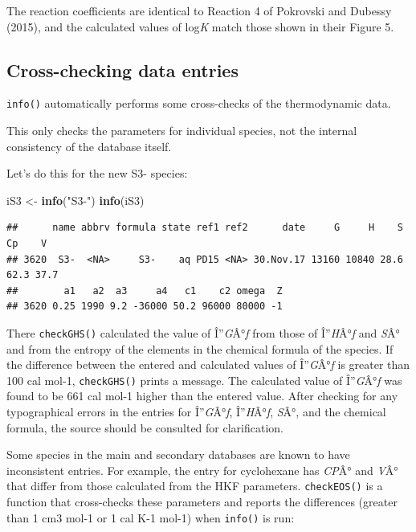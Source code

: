 \documentclass[]{tufte-handout}
\newenvironment{Shaded}{}{}
\newcommand{\KeywordTok}[1]{\textcolor[rgb]{0.00,0.44,0.13}{\textbf{#1}}}
\newcommand{\StringTok}[1]{\textcolor[rgb]{0.25,0.44,0.63}{#1}}
\newcommand{\NormalTok}[1]{#1}
\begin{document}
The reaction coefficients are identical to Reaction 4 of Pokrovski and
Dubessy (2015), and the calculated values of log\emph{K} match those
shown in their Figure 5.

\subsection{Cross-checking data
entries}\label{cross-checking-data-entries}

{\texttt{info()}} automatically performs some cross-checks of the
thermodynamic data.

\begin{marginfigure}
This only checks the parameters for individual species, not the internal
consistency of the database itself.
\end{marginfigure}

Let's do this for the new S3- species:

\begin{Shaded}
\begin{Highlighting}[]
\NormalTok{iS3 <-}\StringTok{ }\KeywordTok{info}\NormalTok{(}\StringTok{"S3-"}\NormalTok{)}
\KeywordTok{info}\NormalTok{(iS3)}
\end{Highlighting}
\end{Shaded}

\begin{verbatim}
##      name abbrv formula state ref1 ref2      date     G     H    S   Cp    V
## 3620  S3-  <NA>     S3-    aq PD15 <NA> 30.Nov.17 13160 10840 28.6 62.3 37.7
##        a1   a2  a3     a4   c1    c2 omega  Z
## 3620 0.25 1990 9.2 -36000 50.2 96000 80000 -1
\end{verbatim}

There {\texttt{checkGHS()}} calculated the value of
Î''\emph{G}Â°\emph{f} from those of Î''\emph{H}Â°\emph{f} and \emph{S}Â°
and from the entropy of the elements \citep{CWM89} in the chemical
formula of the species. If the difference between the entered and
calculated values of Î''\emph{G}Â°\emph{f} is greater than 100 cal
mol-1, {\texttt{checkGHS()}} prints a message. The calculated value of
Î''\emph{G}Â°\emph{f} was found to be 661 cal mol-1 higher than the
entered value. After checking for any typographical errors in the
entries for Î''\emph{G}Â°\emph{f}, Î''\emph{H}Â°\emph{f}, \emph{S}Â°,
and the chemical formula, the source should be consulted for
clarification.

Some species in the main and secondary databases are known to have
inconsistent entries. For example, the entry for cyclohexane has
\emph{C}\emph{P}Â° and \emph{V}Â° that differ from those calculated from
the HKF parameters. {\texttt{checkEOS()}} is a function that
cross-checks these parameters and reports the differences (greater than
1 cm3 mol-1 or 1 cal K-1 mol-1) when {\texttt{info()}} is run:
\end{document}
